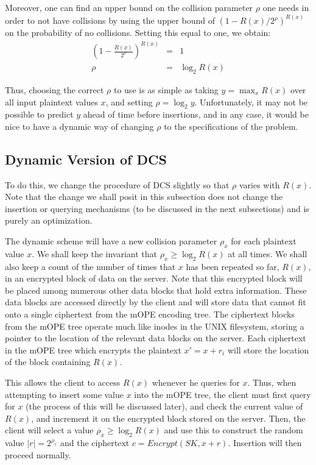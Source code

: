 \documentclass[12pt]{article}
\begin{document}
Moreover, one can find an upper bound on the collision parameter $\rho$ one needs in order to not have collisions by using the upper bound of $(1 - R(x)/2^{\rho})^{R(x)}$ on the probability of no collisions. Setting this equal to one, we obtain:
\begin{eqnarray}
  \left(1 - \frac{R(x)}{2^{\rho}} \right)^{R(x)} &=& 1 \\
                                            \rho &=& \log_2 R(x)
\end{eqnarray}

Thus, choosing the correct $\rho$ to use is as simple as taking $y = \max_x R(x)$ over all input plaintext values $x$, and setting $\rho = \log_2 y$. Unfortunately, it may not be possible to predict $y$ ahead of time before insertions, and in any case, it would be nice to have a dynamic way of changing $\rho$ to the specifications of the problem.

\subsection{Dynamic Version of DCS}

To do this, we change the procedure of DCS slightly so that $\rho$ varies with $R(x)$. Note that the change we shall posit in this subsection does not change the insertion or querying mechanisms (to be discussed in the next subsections) and is purely an optimization.

The dynamic scheme will have a new collision parameter $\rho_x$ for each plaintext value $x$. We shall keep the invariant that $\rho_x \geq \log_2 R(x)$ at all times. We shall also keep a count of the number of times that $x$ has been repeated so far, $R(x)$, in an encrypted block of data on the server. Note that this encrypted block will be placed among numerous other data blocks that hold extra information. These data blocks are accessed directly by the client and will store data that cannot fit onto a single ciphertext from the mOPE encoding tree. The ciphertext blocks from the mOPE tree operate much like inodes in the UNIX filesystem, storing a pointer to the location of the relevant data blocks on the server. Each ciphertext in the mOPE tree which encrypts the plaintext $x' = x + r_i$ will store the location of the block containing $R(x)$.

This allows the client to access $R(x)$ whenever he queries for $x$. Thus, when attempting to insert some value $x$ into the mOPE tree, the client must first query for $x$ (the process of this will be discussed later), and check the current value of $R(x)$, and increment it on the encrypted block stored on the server. Then, the client will select a value $\rho_x \geq \log_2 R(x)$ and use this to construct the random value $|r| = 2^{\rho_x}$ and the ciphertext $c = Encrypt(SK, x + r)$. Insertion will then proceed normally.
\end{document}
